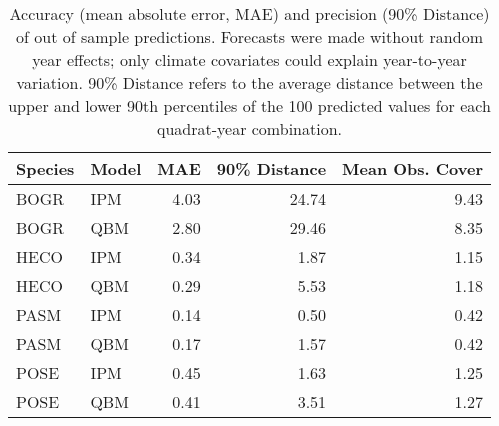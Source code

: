 \begin{table}[ht]
\centering
\caption{Accuracy (mean absolute error, MAE) and precision (90\% Distance) 
                  of out of sample predictions. Forecasts were made without random 
                  year effects; only climate covariates could explain year-to-year 
                  variation. 90\% Distance refers to the average distance between the 
                  upper and lower 90th percentiles of the 100 predicted values for 
                  each quadrat-year combination.} 
\begin{tabular}{llrrr}
  \hline
Species & Model & MAE & 90\% Distance & Mean Obs. Cover \\ 
  \hline
BOGR & IPM & 4.03 & 24.74 & 9.43 \\ 
  BOGR & QBM & 2.80 & 29.46 & 8.35 \\ 
  HECO & IPM & 0.34 & 1.87 & 1.15 \\ 
  HECO & QBM & 0.29 & 5.53 & 1.18 \\ 
  PASM & IPM & 0.14 & 0.50 & 0.42 \\ 
  PASM & QBM & 0.17 & 1.57 & 0.42 \\ 
  POSE & IPM & 0.45 & 1.63 & 1.25 \\ 
  POSE & QBM & 0.41 & 3.51 & 1.27 \\ 
   \hline
\end{tabular}
\end{table}
